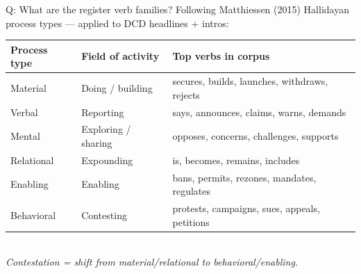 \documentclass[aspectratio=169,11pt]{beamer}
\begin{document}
\begin{frame}[noframenumbering]{\enspace Q: What are the register verb families?}
\footnotesize
Following Matthiessen (2015) Hallidayan process types — applied to DCD headlines + intros:\\[0.4em]
\begin{tabular}{@{}lll@{}}
\toprule
\textbf{Process type} & \textbf{Field of activity} & \textbf{Top verbs in corpus} \\
\midrule
Material    & Doing / building      & secures, builds, launches, withdraws, rejects \\
Verbal      & Reporting             & says, announces, claims, warns, demands \\
Mental      & Exploring / sharing   & opposes, concerns, challenges, supports \\
Relational  & Expounding            & is, becomes, remains, includes \\
Enabling    & Enabling              & bans, permits, rezones, mandates, regulates \\
Behavioral  & Contesting            & protests, campaigns, sues, appeals, petitions \\
\bottomrule
\end{tabular}\\[0.3em]
\textcolor{dcgray}{\textit{Contestation = shift from material/relational to behavioral/enabling.}}
\end{frame}
\end{document}
